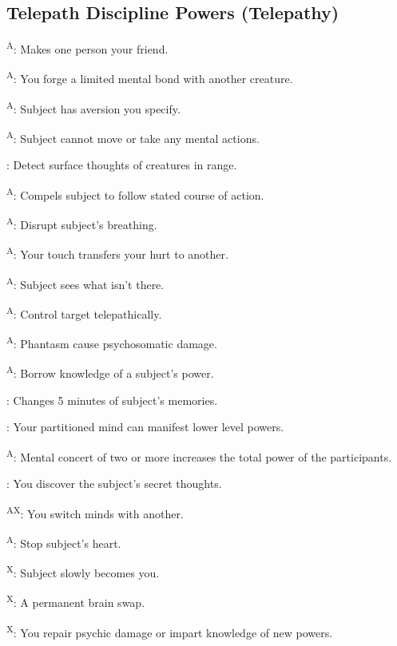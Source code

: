 \subsection{Telepath Discipline Powers {\normalsize(Telepathy)}}
\begin{enumerate*}
\item {}\textsuperscript{A}: Makes one person your friend.

\textsuperscript{A}: You forge a limited mental bond with another creature.

\item {}\textsuperscript{A}: Subject has aversion you specify.

\textsuperscript{A}: Subject cannot move or take any mental actions.

: Detect surface thoughts of creatures in range.

\textsuperscript{A}: Compels subject to follow stated course of 
action.
\item {}\textsuperscript{A}: Disrupt subject's breathing.

\textsuperscript{A}: Your touch transfers your hurt to 
another.

\textsuperscript{A}: Subject sees what isn't there.

\item {}\textsuperscript{A}: Control target telepathically.

\textsuperscript{A}: Phantasm cause psychosomatic damage. %

\textsuperscript{A}: Borrow knowledge of a subject's power.

: Changes 5 minutes of subject's memories.

: Your partitioned mind can manifest lower level powers.

\item {}\textsuperscript{A}: Mental concert of two or more increases the total power of the participants.

: You discover the subject's secret thoughts.

\item {}\textsuperscript{AX}: You switch minds with another.
\item {}\textsuperscript{A}: Stop subject's heart.
\item {}\textsuperscript{X}: Subject slowly becomes you.
\item {}\textsuperscript{X}: A permanent brain swap.

\textsuperscript{X}: You repair psychic damage or impart 
knowledge of new powers.
\end{enumerate*}